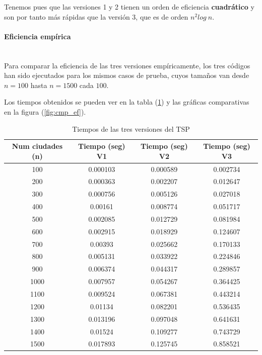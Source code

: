 \documentclass{article}
\newcommand{\myparagraph}[1]{\paragraph{#1}\mbox{}\\}
\begin{document}
Tenemos pues que las versiones 1 y 2 tienen un orden de eficiencia \textbf{cuadrático} y son por tanto más rápidas que la versión 3, que es de orden $n^{2} log \: n$.

\myparagraph{Eficiencia empírica}

Para comparar la eficiencia de las tres versiones empíricamente, los tres códigos han sido ejecutados para los mismos casos de prueba, cuyos tamaños van desde $n=100$ hasta $n=1500$ cada $100$.

Los tiempos obtenidos se pueden ver en la tabla (\ref{tab:p4_time}) y las gráficas comparativas en la figura (\ref{fig:cmp_ef}).

\begin{table}[htbp]
    \centering
    \begin{tabular}{cccc} %
        \toprule
        Num ciudades (n) & Tiempo (seg) V1 & Tiempo (seg) V2 & Tiempo (seg) V3 \\
        \midrule
        100 & 0.000103 & 0.000589 & 0.002734 \\
        200 & 0.000363 & 0.002207 & 0.012647 \\
        300 & 0.000756 & 0.005126 & 0.027018 \\
        400 & 0.00161 & 0.008774 & 0.051717 \\
        500 & 0.002085 & 0.012729 & 0.081984 \\
        600 & 0.002915 & 0.018929 & 0.124607 \\
        700 & 0.00393 & 0.025662 & 0.170133 \\
        800 & 0.005131 & 0.033922 & 0.224846 \\
        900 & 0.006374 & 0.044317 & 0.289857 \\
        1000 & 0.007957 & 0.054267 & 0.364425 \\
        1100 & 0.009524 & 0.067381 & 0.443214 \\
        1200 & 0.01134 & 0.082201 & 0.536435 \\
        1300 & 0.013196 & 0.097048 & 0.641631 \\
        1400 & 0.01524 & 0.109277 & 0.743729 \\
        1500 & 0.017893 & 0.125745 & 0.858521 \\
        \bottomrule
    \end{tabular}
    \caption{Tiempos de las tres versiones del TSP}
    \label{tab:p4_time}
\end{table}
\end{document}
